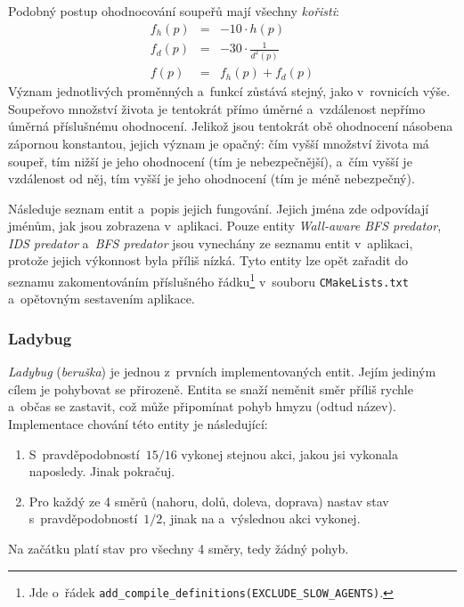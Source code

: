 Podobný postup ohodnocování soupeřů mají všechny \emph{kořisti}:
\begin{eqnarray}
    \label{eq:opponent-health-prey}
    f_h(p) & = & -10 \cdot h(p) \\
    \label{eq:opponent-distance-prey}
    f_d(p) & = & -30 \cdot \frac{1}{d^2(p)} \\
    \label{eq:opponent-eval-prey}
    f(p) & = & f_h(p) + f_d(p)
\end{eqnarray}
Význam jednotlivých proměnných a~funkcí zůstává stejný, jako v~rovnicích výše. Soupeřovo množství života je tentokrát přímo úměrné a~vzdálenost nepřímo úměrná příslušnému ohodnocení. Jelikož jsou tentokrát obě ohodnocení násobena zápornou konstantou, jejich význam je opačný: čím vyšší množství života má soupeř, tím nižší je jeho ohodnocení (tím je nebezpečnější), a~čím vyšší je vzdálenost od něj, tím vyšší je jeho ohodnocení (tím je méně nebezpečný).

Následuje seznam entit a~popis jejich fungování. Jejich jména zde odpovídají jménům, jak jsou zobrazena v~aplikaci. Pouze entity \emph{Wall-aware BFS predator}, \emph{IDS predator} a~\emph{BFS predator} jsou vynechány ze seznamu entit v~aplikaci, protože jejich výkonnost byla příliš nízká. Tyto entity lze opět zařadit do seznamu zakomentováním příslušného řádku\footnote{Jde o~řádek \texttt{add\_compile\_definitions(EXCLUDE\_SLOW\_AGENTS)}.} v~souboru \texttt{CMakeLists.txt} a~opětovným sestavením aplikace.

\subsubsection*{Ladybug}

\emph{Ladybug} (\emph{beruška}) je jednou z~prvních implementovaných entit. Jejím jediným cílem je pohybovat se přirozeně. Entita se snaží neměnit směr příliš rychle a~občas se zastavit, což může připomínat pohyb hmyzu (odtud název). Implementace chování této entity je následující:
\begin{enumerate}
    \item S~pravděpodobností~$15/16$ vykonej stejnou akci, jakou jsi vykonala naposledy. Jinak pokračuj.
    \item Pro každý ze 4 směrů (nahoru, dolů, doleva, doprava) nastav stav  s~pravděpodobností~$1/2$, jinak na  a~výslednou akci vykonej.
\end{enumerate}
Na začátku platí stav  pro všechny 4 směry, tedy žádný pohyb.

